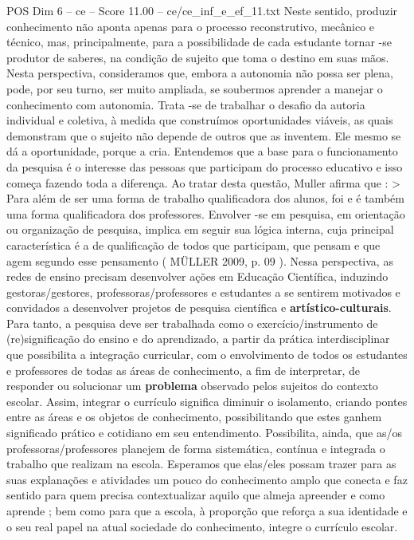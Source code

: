 \begin{textsample}{POS Dim 6 – ce – Score 11.00 – ce/ce\_inf\_e\_ef\_11.txt}
Neste sentido, produzir conhecimento não aponta apenas para o processo reconstrutivo, mecânico e técnico, mas, principalmente, para a possibilidade de cada estudante tornar -se produtor de saberes, na condição de sujeito que toma o destino em suas mãos.
Nesta perspectiva, consideramos que, embora a autonomia não possa ser plena, pode, por seu turno, ser muito ampliada, se soubermos aprender a manejar o conhecimento com autonomia.
Trata -se de trabalhar o desafio da autoria individual e coletiva, à medida que construímos oportunidades viáveis, as quais demonstram que o sujeito não depende de outros que as inventem.
Ele mesmo se dá a oportunidade, porque a cria.
Entendemos que a base para o funcionamento da pesquisa é o interesse das pessoas que participam do processo educativo e isso começa fazendo toda a diferença.
Ao tratar desta questão, Muller afirma que : > Para além de ser uma forma de trabalho qualificadora dos alunos, foi e é também uma forma qualificadora dos professores.
Envolver -se em pesquisa, em orientação ou organização de pesquisa, implica em seguir sua lógica interna, cuja principal característica é a de qualificação de todos que participam, que pensam e que agem segundo esse pensamento ( MÜLLER 2009, p. 09 ).
Nessa perspectiva, as redes de ensino precisam desenvolver ações em Educação Científica, induzindo gestoras/gestores, professoras/professores e estudantes a se sentirem motivados e convidados a desenvolver projetos de pesquisa científica e \textbf{artístico-culturais}.
Para tanto, a pesquisa deve ser trabalhada como o exercício/instrumento de (re)significação do ensino e do aprendizado, a partir da prática interdisciplinar que possibilita a integração curricular, com o envolvimento de todos os estudantes e professores de todas as áreas de conhecimento, a fim de interpretar, de responder ou solucionar um \textbf{problema} observado pelos sujeitos do contexto escolar.
Assim, integrar o currículo significa diminuir o isolamento, criando pontes entre as áreas e os objetos de conhecimento, possibilitando que estes ganhem significado prático e cotidiano em seu entendimento.
Possibilita, ainda, que as/os professoras/professores planejem de forma sistemática, contínua e integrada o trabalho que realizam na escola.
Esperamos que elas/eles possam trazer para as suas explanações e atividades um pouco do conhecimento amplo que conecta e faz sentido para quem precisa contextualizar aquilo que almeja apreender e como aprende ; bem como para que a escola, à proporção que reforça a sua identidade e o seu real papel na atual sociedade do conhecimento, integre o currículo escolar.

\end{textsample}
